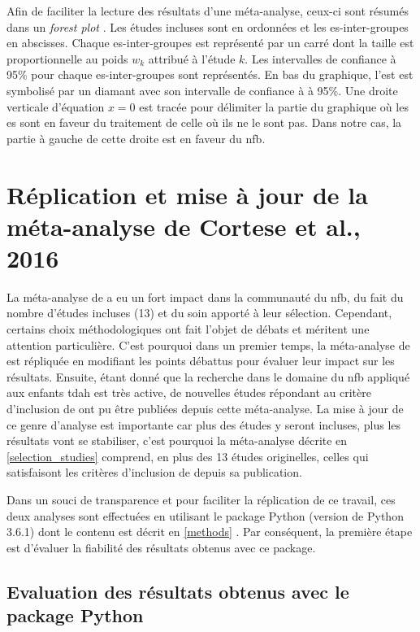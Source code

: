 Afin de faciliter la lecture des résultats d'une méta-analyse, ceux-ci sont résumés dans un \textit{forest plot} \citep[Chapitre~1]{Borenstein2009}. Les études incluses sont
en ordonnées et les \gls{es}-inter-groupes en abscisses. Chaque \gls{es}-inter-groupes est représenté par un carré dont la taille est proportionnelle
au poids $w_k$ attribué à l'étude $k$. Les intervalles de confiance à 95\% pour chaque \gls{es}-inter-groupes sont représentés. En bas du graphique, l'\gls{est}
est symbolisé par un diamant avec son intervalle de confiance à à 95\%. Une droite verticale d'équation $x = 0$ est tracée pour délimiter la
partie du graphique où les \gls{es} sont en faveur du traitement de celle où ils ne le sont pas. Dans notre cas, la partie à gauche de cette droite
est en faveur du \gls{nfb}.

\section{Réplication et mise à jour de la méta-analyse de Cortese et al., 2016} 

La méta-analyse de \citet{Cortese2016} a eu un fort impact dans la communauté du \gls{nfb}, du fait du nombre d'études incluses (13) et 
du soin apporté à leur sélection. Cependant, certains choix méthodologiques ont fait l'objet de débats \citep{Micoulaud2016} et
méritent une attention particulière.
C'est pourquoi dans un premier temps, la méta-analyse de \citet{Cortese2016} est répliquée en modifiant les points débattus pour évaluer leur impact sur les
résultats. Ensuite, étant donné que la recherche dans le domaine du \gls{nfb} appliqué aux enfants \gls{tdah} est très active, de nouvelles études répondant au 
critère d'inclusion de \citet{Cortese2016} ont pu être publiées depuis cette méta-analyse. La mise à jour de ce genre d'analyse est importante
car plus des études y seront incluses, plus les résultats vont se stabiliser, c'est pourquoi la méta-analyse décrite en \ref{selection_studies}
comprend, en plus des 13 études originelles, celles qui
satisfaisont les critères d'inclusion de \citet{Cortese2016} depuis sa publication.

Dans un souci de transparence et pour faciliter la réplication de ce travail, ces deux analyses sont effectuées en utilisant le package Python 
(version de Python 3.6.1) dont le contenu est décrit en \ref{methods} \citep{Bussalb2019c}. Par conséquent, la première étape est d'évaluer la
fiabilité des résultats obtenus avec ce package.

\subsection{Evaluation des résultats obtenus avec le package Python} 

